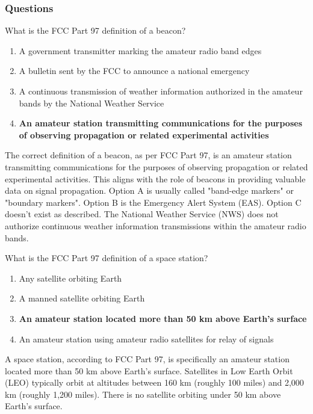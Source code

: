 \subsubsection*{Questions}

\begin{tcolorbox}[colback=gray!10!white,colframe=black!75!black,title={T1A06}]
    What is the FCC Part 97 definition of a beacon?
    \begin{enumerate}[label=\Alph*),noitemsep]
        \item A government transmitter marking the amateur radio band edges
        \item A bulletin sent by the FCC to announce a national emergency
        \item A continuous transmission of weather information authorized in the amateur bands by the National Weather Service
        \item \textbf{An amateur station transmitting communications for the purposes of observing propagation or related experimental activities}
    \end{enumerate}
\end{tcolorbox}
The correct definition of a beacon, as per FCC Part 97, is an amateur station transmitting communications for the purposes of observing propagation or related experimental activities. This aligns with the role of beacons in providing valuable data on signal propagation. Option A is usually called "band-edge markers" or "boundary markers". Option B is the Emergency Alert System (EAS). Option C doesn't exist as described. The National Weather Service (NWS) does not authorize continuous weather information transmissions within the amateur radio bands.

\begin{tcolorbox}[colback=gray!10!white,colframe=black!75!black,title={T1A07}]
    What is the FCC Part 97 definition of a space station?
    \begin{enumerate}[label=\Alph*),noitemsep]
        \item Any satellite orbiting Earth
        \item A manned satellite orbiting Earth
        \item \textbf{An amateur station located more than 50 km above Earth's surface}
        \item An amateur station using amateur radio satellites for relay of signals
    \end{enumerate}
\end{tcolorbox}
A space station, according to FCC Part 97, is specifically an amateur station located more than 50 km above Earth's surface. Satellites in Low Earth Orbit (LEO) typically orbit at altitudes between 160 km (roughly 100 miles) and 2,000 km (roughly 1,200 miles). There is no satellite orbiting under 50 km above Earth's surface.

